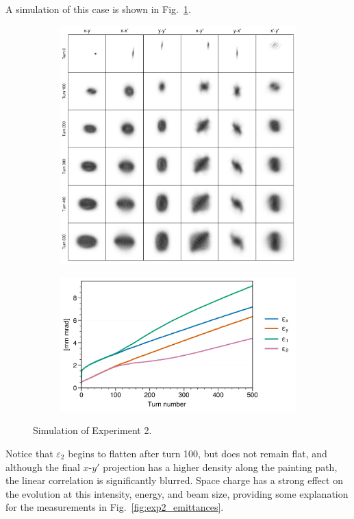 A simulation of this case is shown in Fig.~\ref{fig:exp2_sim}.
%
\begin{figure}[!p]
    \centering
    \begin{subfigure}{\textwidth}
        \includegraphics[width=\textwidth]{Images/chapter5/exp2/sim_snapshots.png}
    \end{subfigure}
    \vfill
    \vspace*{1.0cm}
    \vfill
    \begin{subfigure}{0.7\textwidth}
        \includegraphics[width=\textwidth]{Images/chapter5/exp2/sim_emittances.png}
    \end{subfigure}
    \caption{Simulation of Experiment 2.}
    \label{fig:exp2_sim}
\end{figure}
%
Notice that $\varepsilon_2$ begins to flatten after turn 100, but does not remain flat, and although the final $x$-$y'$ projection has a higher density along the painting path, the linear correlation is significantly blurred. Space charge has a strong effect on the evolution at this intensity, energy, and beam size, providing some explanation for the measurements in Fig.~\ref{fig:exp2_emittances}.




